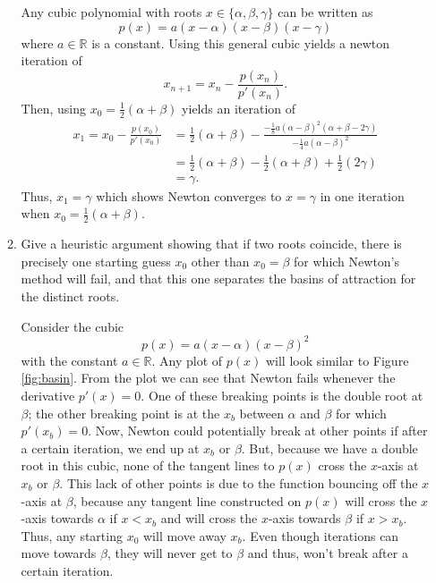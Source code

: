 \documentclass[a4paper,12pt]{article}
\newcommand{\reals}{\mathbb{R}}
\begin{document}
\begin{enumerate}[label = \arabic*.]
\begin{enumerate}[label = \roman*.]
			Any cubic polynomial with roots $ x \in \{\alpha, \beta, \gamma \} $ can be written as
			\[
				p(x) = a (x - \alpha)(x - \beta)(x - \gamma)
			\]
			where $ a \in \reals $ is a constant. Using this general cubic yields a newton iteration of
			\[
				x_{n+1} = x_n - \frac{p(x_n)}{p'(x_n)}.
			\]
			Then, using $ x_0 = \frac{1}{2}(\alpha + \beta) $ yields an iteration of
			\begin{align*}
				x_1 = x_0 - \frac{p(x_0)}{p'(x_0)} &= \frac{1}{2}(\alpha + \beta)  - \frac{-\frac{1}{8} a (\alpha - \beta)^2 (\alpha + \beta - 2\gamma)}{-\frac{1}{4} a (\alpha - \beta)^2} \\
				&= \frac{1}{2}(\alpha + \beta)  - \frac{1}{2}(\alpha + \beta) + \frac{1}{2} (2\gamma) \\
				&= \gamma.
			\end{align*}
			Thus, $ x_1 = \gamma $ which shows Newton converges to $ x = \gamma $ in one iteration when $ x_0 = \frac{1}{2}(\alpha + \beta) $.
			
			\item Give a heuristic argument showing that if two roots coincide, there is precisely one starting guess $ x_0 $ other than $ x_0 = \beta $ for which Newton's method will fail, and that this one separates the basins of attraction for the distinct roots.
			
			Consider the cubic
			\[
				p(x) = a (x - \alpha)(x - \beta)^2
			\]
			with the constant $ a \in \reals$.  Any plot of $ p(x) $ will look similar to Figure \ref{fig:basin}. From the plot we can see that Newton fails whenever the derivative $ p'(x) = 0 $. One of these breaking points is the double root at $ \beta $; the other breaking point is at the $ x_b $ between $ \alpha $ and $ \beta $ for which $ p'(x_b) = 0 $. Now, Newton could potentially break at other points if after a certain iteration, we end up at $ x_b $ or $ \beta $. But, because we have a double root in this cubic, none of the tangent lines to $ p(x) $ cross the $ x $-axis at $ x_b $ or $ \beta $. This lack of other points is due to the function bouncing off the $ x $-axis at $ \beta $, because any tangent line constructed on $ p(x) $ will cross the $ x $-axis towards $ \alpha $ if $ x < x_b $ and will cross the $ x $-axis towards $ \beta $ if $ x > x_b $. Thus, any starting $ x_0 $ will move away $ x_b $. Even though iterations can move towards $ \beta $, they will never get to $ \beta $ and thus, won't break after a certain iteration.
			

\end{enumerate}
\end{enumerate}
\end{document}

